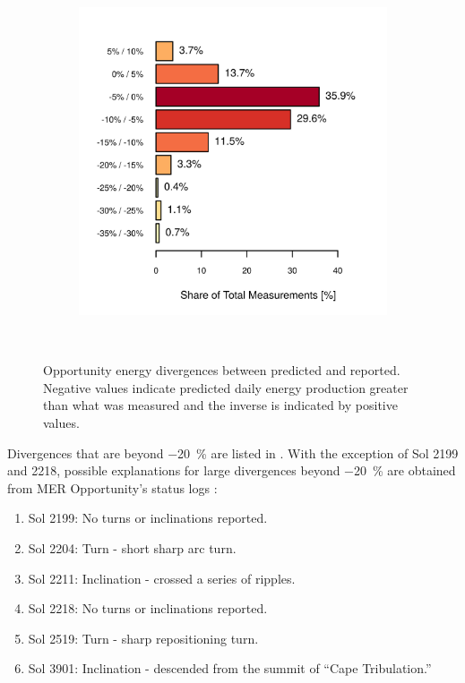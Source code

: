 \begin{figure}[h]
\begin{subfigure}[t]{\subfigureWidth}
            \includegraphics[height=\graphicsHeight]{sections/mars-solar-energy/photovoltaic-energy/plots/binned-error-margins.png}
            \label{fig:plot:binned-error-margins}
    \end{subfigure}\\[0.8ex]
    \caption[Opportunity energy divergences between predicted and reported]
    {Opportunity energy divergences between predicted and reported. Negative values indicate predicted daily energy production greater than what was measured and the inverse is indicated by positive values.}
    \label{fig:plot:energy-divergence}
\vspace{-2ex}
\end{figure}

Divergences that are beyond \SI{-20}{\percent} are listed in . With the exception of Sol 2199 and 2218, possible explanations for large divergences beyond \SI{-20}{\percent} are obtained from \ac{MER} Opportunity's status logs :

\begin{enumerate}[label=\textcolor{BulletBlue}{(\alph*)}]
  \item Sol 2199: No turns or inclinations reported.
  \item Sol 2204: Turn - short sharp arc turn.
  \item Sol 2211: Inclination - crossed a series of ripples.
  \item Sol 2218: No turns or inclinations reported.
  \item Sol 2519: Turn - sharp repositioning turn.
  \item Sol 3901: Inclination - descended from the summit of ``Cape Tribulation.''
\end{enumerate}

